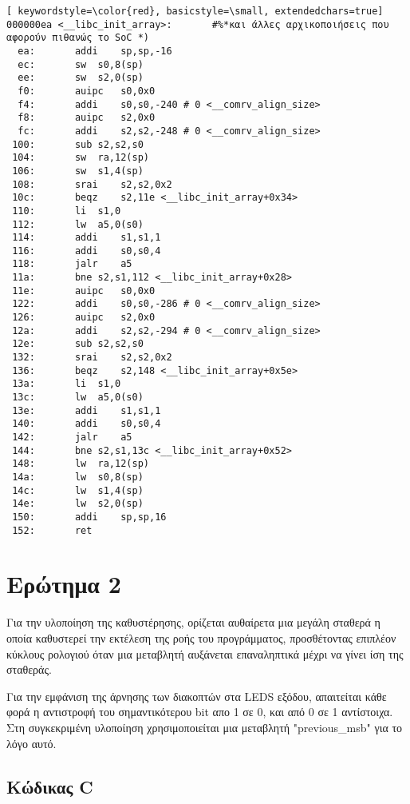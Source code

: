 \documentclass[a4paper]{article}
\begin{document}
\begin{lstlisting}[ keywordstyle=\color{red}, basicstyle=\small, extendedchars=true]
000000ea <__libc_init_array>:		#%*και άλλες αρχικοποιήσεις που αφορούν πιθανώς τo SoC *)
  ea:		addi	sp,sp,-16
  ec:		sw	s0,8(sp)
  ee:		sw	s2,0(sp)
  f0:		auipc	s0,0x0
  f4:		addi	s0,s0,-240 # 0 <__comrv_align_size>
  f8:		auipc	s2,0x0
  fc:		addi	s2,s2,-248 # 0 <__comrv_align_size>
 100:		sub	s2,s2,s0
 104:		sw	ra,12(sp)
 106:		sw	s1,4(sp)
 108:		srai	s2,s2,0x2
 10c:		beqz	s2,11e <__libc_init_array+0x34>
 110:		li	s1,0
 112:		lw	a5,0(s0)
 114:		addi	s1,s1,1
 116:		addi	s0,s0,4
 118:		jalr	a5
 11a:		bne	s2,s1,112 <__libc_init_array+0x28>
 11e:		auipc	s0,0x0
 122:		addi	s0,s0,-286 # 0 <__comrv_align_size>
 126:		auipc	s2,0x0
 12a:		addi	s2,s2,-294 # 0 <__comrv_align_size>
 12e:		sub	s2,s2,s0
 132:		srai	s2,s2,0x2
 136:		beqz	s2,148 <__libc_init_array+0x5e>
 13a:		li	s1,0
 13c:		lw	a5,0(s0)
 13e:		addi	s1,s1,1
 140:		addi	s0,s0,4
 142:		jalr	a5
 144:		bne	s2,s1,13c <__libc_init_array+0x52>
 148:		lw	ra,12(sp)
 14a:		lw	s0,8(sp)
 14c:		lw	s1,4(sp)
 14e:		lw	s2,0(sp)
 150:		addi	sp,sp,16
 152:		ret
\end{lstlisting}

\vspace{\baselineskip}
\vspace{\baselineskip}
\vspace{\baselineskip}
\vspace{\baselineskip}
\vspace{\baselineskip}
\vspace{\baselineskip}
\pagebreak
\section*{Ερώτημα 2}
\par
Για την υλοποίηση της καθυστέρησης, ορίζεται αυθαίρετα μια μεγάλη σταθερά η οποία καθυστερεί την εκτέλεση της ροής του προγράμματος, προσθέτοντας επιπλέον 
κύκλους ρολογιού όταν μια μεταβλητή αυξάνεται επαναληπτικά μέχρι να γίνει ίση της σταθεράς.
\par
Για την εμφάνιση της άρνησης των διακοπτών στα LEDS εξόδου, απαιτείται κάθε φορά η αντιστροφή του σημαντικότερου bit απο 1 σε 0, και από 0 σε 1 αντίστοιχα. 
Στη συγκεκριμένη υλοποίηση χρησιμοποιείται μια μεταβλητή "previous\_msb" για το λόγο αυτό.
\subsection*{Κώδικας C}
\end{document}
